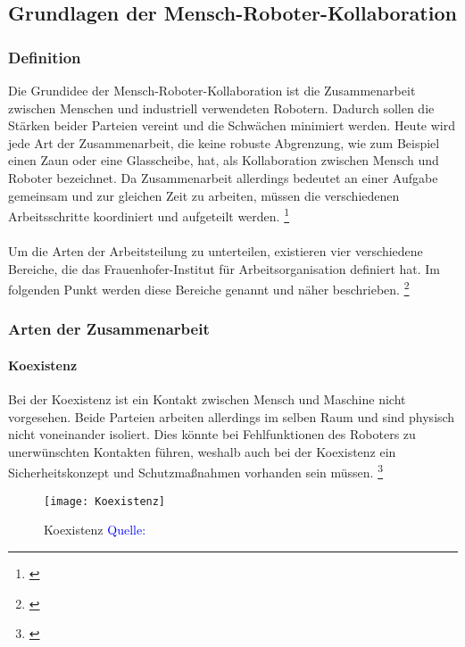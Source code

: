\documentclass[titlepage,12pt,twoside]{article}
\begin{document}
\subsection{Grundlagen der Mensch-Roboter-Kollaboration}
\subsubsection{Definition}
Die Grundidee der Mensch-Roboter-Kollaboration ist die Zusammenarbeit zwischen 
Menschen und industriell verwendeten Robotern. Dadurch sollen die Stärken beider 
Parteien vereint und die Schwächen minimiert werden. Heute wird jede Art der 
Zusammenarbeit, die keine robuste Abgrenzung, wie zum Beispiel einen Zaun oder 
eine Glasscheibe, hat, als Kollaboration zwischen Mensch und Roboter bezeichnet. 
Da Zusammenarbeit allerdings bedeutet an einer Aufgabe gemeinsam und zur gleichen 
Zeit zu arbeiten, müssen die verschiedenen Arbeitsschritte koordiniert und 
aufgeteilt werden. \footnote{\cite{rubigm.p10}} \\
\\
Um die Arten der Arbeitsteilung zu unterteilen, existieren vier verschiedene 
Bereiche, die das Frauenhofer-Institut für Arbeitsorganisation definiert hat. Im 
folgenden Punkt werden diese Bereiche genannt und näher beschrieben. \footnote{\cite{rubigm.p11}}\\
\subsubsection{Arten der Zusammenarbeit}
\paragraph{Koexistenz}
\hfill \break
\hfill \break
Bei der Koexistenz ist ein Kontakt zwischen Mensch und Maschine nicht vorgesehen. 
Beide Parteien arbeiten allerdings im selben Raum und sind physisch nicht 
voneinander isoliert. Dies könnte bei Fehlfunktionen des Roboters zu unerwünschten 
Kontakten führen, weshalb auch bei der Koexistenz ein Sicherheitskonzept und 
Schutzmaßnahmen vorhanden sein müssen. \footnote{\cite{rubigm.p11}} \\
\begin{figure}[H]
	\begin{center}
		\scalebox{0.4}
		{\texttt{[image: Koexistenz]}}
		\caption{Koexistenz \textcolor{blue}{Quelle: \cite{rubigm.p11}}}
		\label{fig:Koexistenz}
	\end{center}
\end{figure}
\hfill \break
\end{document}

